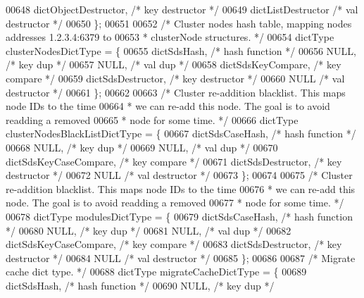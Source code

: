 \begin{DoxyCode}
{{{{{00648     dictObjectDestructor,       \textcolor{comment}{/* key destructor */}
00649     dictListDestructor          \textcolor{comment}{/* val destructor */}
00650 \};
00651 
00652 \textcolor{comment}{/* Cluster nodes hash table, mapping nodes addresses 1.2.3.4:6379 to}
00653 \textcolor{comment}{ * clusterNode structures. */}
00654 dictType clusterNodesDictType = \{
00655     dictSdsHash,                \textcolor{comment}{/* hash function */}
00656     NULL,                       \textcolor{comment}{/* key dup */}
00657     NULL,                       \textcolor{comment}{/* val dup */}
00658     dictSdsKeyCompare,          \textcolor{comment}{/* key compare */}
00659     dictSdsDestructor,          \textcolor{comment}{/* key destructor */}
00660     NULL                        \textcolor{comment}{/* val destructor */}
00661 \};
00662 
00663 \textcolor{comment}{/* Cluster re-addition blacklist. This maps node IDs to the time}
00664 \textcolor{comment}{ * we can re-add this node. The goal is to avoid readding a removed}
00665 \textcolor{comment}{ * node for some time. */}
00666 dictType clusterNodesBlackListDictType = \{
00667     dictSdsCaseHash,            \textcolor{comment}{/* hash function */}
00668     NULL,                       \textcolor{comment}{/* key dup */}
00669     NULL,                       \textcolor{comment}{/* val dup */}
00670     dictSdsKeyCaseCompare,      \textcolor{comment}{/* key compare */}
00671     dictSdsDestructor,          \textcolor{comment}{/* key destructor */}
00672     NULL                        \textcolor{comment}{/* val destructor */}
00673 \};
00674 
00675 \textcolor{comment}{/* Cluster re-addition blacklist. This maps node IDs to the time}
00676 \textcolor{comment}{ * we can re-add this node. The goal is to avoid readding a removed}
00677 \textcolor{comment}{ * node for some time. */}
00678 dictType modulesDictType = \{
00679     dictSdsCaseHash,            \textcolor{comment}{/* hash function */}
00680     NULL,                       \textcolor{comment}{/* key dup */}
00681     NULL,                       \textcolor{comment}{/* val dup */}
00682     dictSdsKeyCaseCompare,      \textcolor{comment}{/* key compare */}
00683     dictSdsDestructor,          \textcolor{comment}{/* key destructor */}
00684     NULL                        \textcolor{comment}{/* val destructor */}
00685 \};
00686 
00687 \textcolor{comment}{/* Migrate cache dict type. */}
00688 dictType migrateCacheDictType = \{
00689     dictSdsHash,                \textcolor{comment}{/* hash function */}
00690     NULL,                       \textcolor{comment}{/* key dup */}
}}}}}
\end{DoxyCode}
